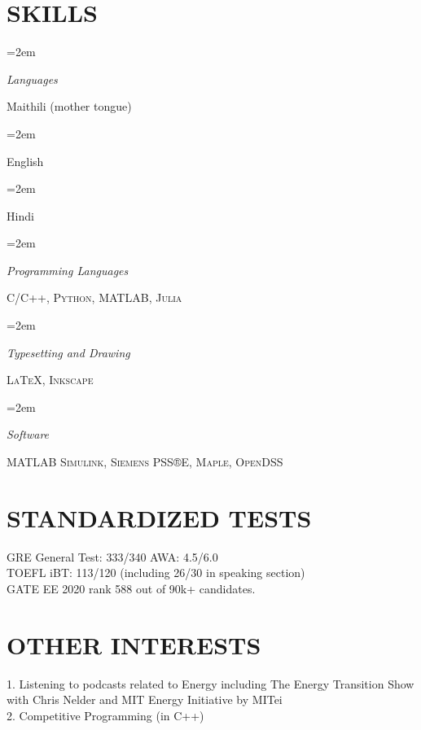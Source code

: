 \documentclass[paper=a4,fontsize=11pt]{scrartcl} %
\newlength{\spacebox}
\newcommand{\sepspace}{\vspace*{1em}}		%
\newcommand{\NewPart}[1]{\section*{\uppercase{#1}}}
\newcommand{\PersonalEntry}[2]{
		\noindent\hangindent=2em\hangafter=0 %
		\parbox{\spacebox}{        %
		\textit{#1}}		       %
		\hspace{1.5em} #2 \par}    %
\newcommand{\SkillsEntry}[2]{      %
		\noindent\hangindent=2em\hangafter=0 %
		\parbox{\spacebox}{        %
		\textit{#1}}			   %
		\hspace{1.5em} #2 \par}    %
\begin{document}
\clearpage

\NewPart{Skills}{}

\SkillsEntry{Languages}{Maithili (mother tongue)}
\SkillsEntry{}{English}
\SkillsEntry{}{Hindi}
\sepspace

\SkillsEntry{Programming Languages}{\textsc{C/C++}, \textsc{Python}, \textsc{MATLAB}, \textsc{Julia}}
\sepspace

\SkillsEntry{Typesetting and Drawing}{\textsc{\LaTeX}, \textsc{Inkscape}}
\sepspace

\SkillsEntry{Software}{\textsc{MATLAB Simulink}, \textsc{Siemens PSS®E}, \textsc{Maple}, \textsc{OpenDSS}}
\sepspace

\NewPart{Standardized Tests}{}

GRE General Test: 333/340 AWA: 4.5/6.0 \\
TOEFL iBT: 113/120 (including 26/30 in speaking section) \\
GATE EE 2020 rank 588 out of 90k+ candidates.

\NewPart{Other Interests}{}
1. Listening to podcasts related to Energy including The Energy Transition Show with Chris Nelder and MIT Energy Initiative by MITei
\\
\sepspace
2. Competitive Programming (in C++)
\end{document}
